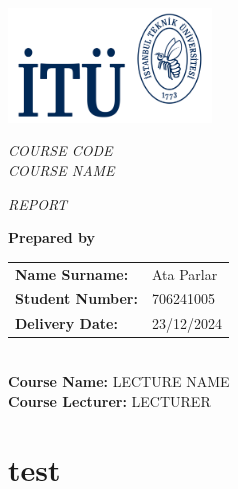 \documentclass[12pt]{article}
\begin{document}
\begin{titlepage}
    \thispagestyle{title_page}

    \raggedleft%
    \includegraphics[width=5.4102cm]{logo_laci.png}\\ %

    \vspace{2cm}

    \raggedright%
    {\sffamily \Huge{\textit{COURSE CODE}}\\[1cm]}
    {\sffamily \LARGE{\textit{COURSE NAME}}\\[0.5cm]}
    {\sffamily \Large{\textit{REPORT}}\\[2cm]}
    
    \vfill
    
    \textbf{\large{Prepared by}} \\[0.5cm]
    \begin{tabular}{ll}
        \textbf{Name Surname:} & Ata Parlar \\
        \textbf{Student Number:} & 706241005 \\
        \textbf{Delivery Date:} & 23/12/2024 \\
    \end{tabular} \\[1cm]
    
    \textbf{Course Name:} LECTURE NAME \\[0.5cm]
    \textbf{Course Lecturer:} LECTURER
    
    \vfill
    
    
\end{titlepage}


\pagestyle{plain}

\section{test}
\end{document}
